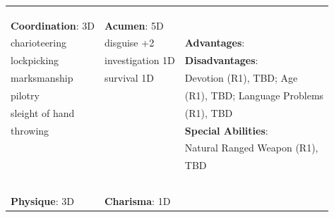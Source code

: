 \documentclass[10pt]{article}
\begin{document}
\begin{table}
\begin{tabular}{m{156pt} m{156pt} m{156pt}}
 \hrulefill &  \hrulefill & \\

 \hrulefill &  \hrulefill & \\

 \hrulefill &  \hrulefill & \\


\textbf{Coordination}: 3D \hrulefill & \textbf{Acumen}: 5D \hrulefill     & \hrulefill \\

charioteering        \hrulefill & disguise          +2 \hrulefill & \textbf{Advantages}: \hrulefill \\

lockpicking          \hrulefill & investigation     1D \hrulefill & \textbf{Disadvantages}: \hrulefill \\

marksmanship         \hrulefill & survival          1D \hrulefill & Devotion (R1), TBD; Age \hrulefill \\

pilotry              \hrulefill &  \hrulefill & (R1), TBD; Language Problems \hrulefill \\

sleight of hand      \hrulefill &  \hrulefill & (R1), TBD \hrulefill \\

throwing             \hrulefill &  \hrulefill & \textbf{Special Abilities}: \hrulefill \\

 \hrulefill &  \hrulefill & Natural Ranged Weapon (R1), \hrulefill \\

 \hrulefill &  \hrulefill & TBD \hrulefill \\

 \hrulefill &  \hrulefill &  \hrulefill \\

 \hrulefill &  \hrulefill &  \hrulefill \\

 \hrulefill &  \hrulefill &  \hrulefill \\

 \hrulefill &  \hrulefill &  \hrulefill \\

 \hrulefill &  \hrulefill &  \hrulefill \\


\textbf{Physique}: 3D \hrulefill & \textbf{Charisma}: 1D \hrulefill     &  \hrulefill \\


\end{tabular}
\end{table}
\end{document}

